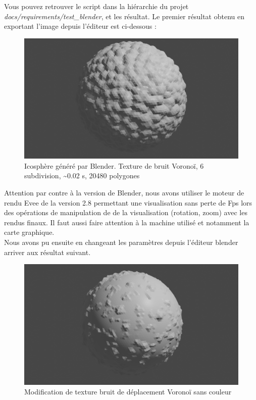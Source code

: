 \documentclass[a4paper]{article}
\begin{document}
Vous pouvez retrouver le script dans la hiérarchie du projet \textit{docs/requirements/test\_blender}, et les résultat. Le premier résultat obtenu en exportant l'image depuis l'éditeur est ci-dessous :
\begin{figure}[!h]
\begin{center} \includegraphics[width=0.5\linewidth]{img/blender_1.png} \end{center}
\caption{Icosphère généré par Blender. Texture de bruit Voronoï, 6 subdivision, \textasciitilde0.02 s, 20480 polygones}
\end{figure}

Attention par contre à la version de Blender, nous avons utiliser le moteur de rendu Evee de la version 2.8 permettant une visualisation sans perte de Fps lors des opérations de manipulation de de la visualisation (rotation, zoom) avec les rendus finaux. Il faut aussi faire attention à la machine utilisé et notamment la carte graphique.\\
Nous avons pu ensuite en changeant les paramètres depuis l'éditeur blender arriver aux résultat suivant.

\newpage
\begin{figure}[!h]
\begin{center} \includegraphics[width=0.5\linewidth]{img/blender_2.png} \end{center}
\caption{Modification de texture bruit de déplacement Voronoï sans couleur}
\end{figure}
\end{document}

